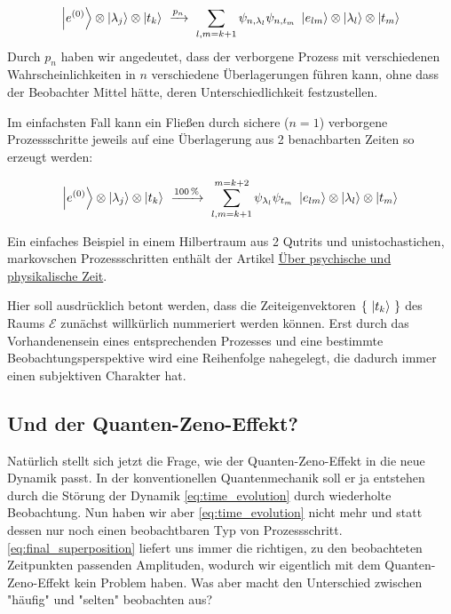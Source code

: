 \documentclass[12pt]{article}
\begin{document}
\begin{equation} 
\label{eq:preparation_with_time}
\ket{e^{(0)}} \otimes \ket{\lambda_j} \otimes \ket{t_k}
\ \xrightarrow{p_{n}}\ 
\sum_{l,m=k+1} \psi_{n,\lambda_l}\psi_{n,t_m} \ \ket{e_{lm}} \otimes \ket{\lambda_l} \otimes \ket{t_m} 
\end{equation}
Durch $p_n$ haben wir angedeutet, dass der verborgene Prozess mit verschiedenen  Wahrscheinlichkeiten in $n$ verschiedene Überlagerungen führen kann, ohne dass der Beobachter Mittel hätte, deren Unterschiedlichkeit festzustellen.

Im einfachsten Fall kann ein Fließen durch sichere ($n=1$) verborgene Prozessschritte jeweils auf eine Überlagerung aus 2 benachbarten Zeiten so erzeugt werden:

\begin{equation*} 
\ket{e^{(0)}} \otimes \ket{\lambda_j} \otimes \ket{t_k}
\ \xrightarrow{100\,\%}\ 
\sum_{l,m=k+1}^{m=k+2} \psi_{\lambda_l}\psi_{t_m} \ \ket{e_{lm}} \otimes \ket{\lambda_l} \otimes \ket{t_m} 
\end{equation*}

Ein einfaches Beispiel in einem Hilbertraum aus 2 Qutrits und unistochastichen, markovschen Prozessschritten enthält der Artikel \href{http://vermaschung.de/index.php?title=Warum_Panpsychismus%3F}{Über psychische und physikalische Zeit}. 

Hier soll ausdrücklich betont werden, dass die Zeiteigenvektoren $\{\ \ket{t_k}\ \}$ des Raums $\mathscr{E}$ zunächst willkürlich nummeriert werden können. Erst durch das Vorhandenensein eines entsprechenden Prozesses und eine bestimmte Beobachtungsperspektive wird eine Reihenfolge nahegelegt, die dadurch immer einen subjektiven Charakter hat.

\subsection{Und der Quanten-Zeno-Effekt?}

Natürlich stellt sich jetzt die Frage, wie der Quanten-Zeno-Effekt in die neue Dynamik passt. In der konventionellen Quantenmechanik soll er ja entstehen durch die Störung der Dynamik \eqref{eq:time_evolution} durch wiederholte Beobachtung. Nun haben wir aber \eqref{eq:time_evolution} nicht mehr und statt dessen nur noch einen beobachtbaren Typ von Prozessschritt. \eqref{eq:final_superposition} liefert uns immer die richtigen, zu den beobachteten Zeitpunkten passenden Amplituden, wodurch wir eigentlich mit dem Quanten-Zeno-Effekt kein Problem haben. Was aber macht den Unterschied zwischen "häufig" und "selten" beobachten aus?
\end{document}
